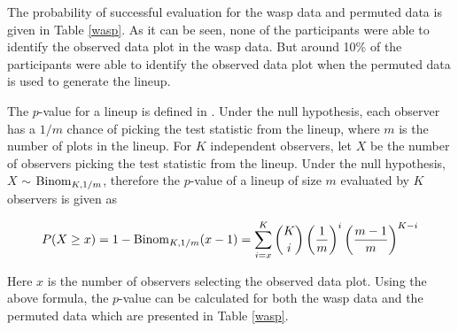 \documentclass[12]{article}
\begin{document}

The probability of successful evaluation for the wasp data and permuted data is given in Table \ref{wasp}. As it can be seen, none of the participants were able to identify the observed data plot in the wasp data. But around 10\% of the participants were able to identify the observed data plot when the permuted data is used to generate the lineup.  



The $p$-value for a lineup is defined in \cite{majumder:2011}. Under the null hypothesis, each observer has a $1/m$ chance of picking the test statistic from the lineup, where $m$ is the number of plots in the lineup. For $K$ independent observers, let $X$ be the number of observers picking the test statistic from the lineup. Under the null hypothesis, $X$ $\sim$ $\hbox{Binom}_{K, 1/m}$, therefore the $p$-value of a lineup of size $m$ evaluated by $K$ observers is given as

$$P(X \ge x) = 1 - \hbox{Binom}_{K, 1/m}(x - 1) = \sum_{i = x}^K {K \choose i} \left(\frac{1}{m} \right)^i \left(\frac{m - 1}{m}\right)^{K - i}$$

Here $x$ is the number of observers selecting the observed data plot. Using the above formula, the $p$-value can be calculated for both the wasp data and the permuted data which are presented in Table \ref{wasp}.  
\end{document}
